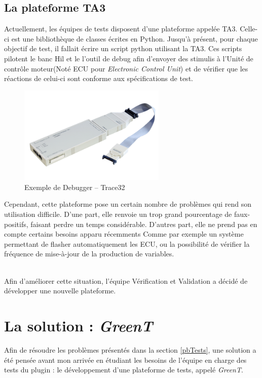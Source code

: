 	\subsection{La plateforme TA3}
	Actuellement, les équipes de tests disposent d'une plateforme appelée TA3. Celle-ci est une bibliothèque de classes écrites en Python. Jusqu'à présent, pour chaque objectif de test, il fallait écrire un script python utilisant la TA3. Ces scripts pilotent le banc Hil et le l'outil de debug afin d'envoyer des stimulis à l'Unité de contrôle moteur(Noté ECU pour \textit{Electronic Control Unit}) et de vérifier que les réactions de celui-ci sont conforme aux spécifications de test.
	\begin{figure}[H]		
		\centering
		\includegraphics[width=7cm]{contents/images/trace32.png}
		\caption{Exemple de Debugger -- Trace32}
		\label{fig:photoHil}
	\end{figure}

	Cependant, cette plateforme pose un certain nombre de problèmes qui rend son utilisation difficile. D'une part, elle renvoie un trop grand pourcentage de faux-positifs, faisant perdre un temps considérable. D'autres part, elle ne prend pas en compte certains besoins apparu récemments Comme par exemple un système permettant de flasher automatiquement les ECU, ou la possibilité de vérifier la fréquence de mise-à-jour de la production de variables.
\\~

	Afin d'améliorer cette situation, l'équipe Vérification et Validation a décidé de développer une nouvelle plateforme.

	\section{La solution : \textit{GreenT}}
	Afin de résoudre les problèmes présentés dans la section \ref{pbTests}, une solution a été pensée avant mon arrivée en étudiant les besoins de l'équipe en charge des tests du plugin : le développement d'une plateforme de tests, appelé \textit{GreenT}.

